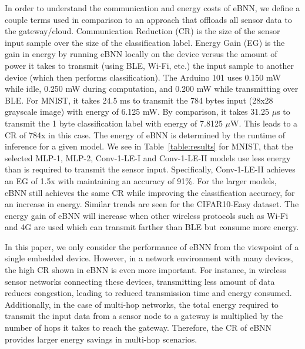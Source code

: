 \documentclass[10pt,emptycopyrightspace]{ewsn-proc}
\begin{document}
In order to understand the communication and energy costs of eBNN, we define a couple terms used in comparison to an approach that offloads all sensor data to the gateway/cloud. Communication Reduction (CR) is the size of the sensor input sample over the size of the classification label. Energy Gain (EG) is the gain in energy by running eBNN locally on the device versus the amount of power it takes to transmit (using BLE, Wi-Fi, etc.) the input sample to another device (which then performs classification). The Arduino 101 uses 0.150 mW while idle,  0.250 mW during computation, and 0.200 mW while transmitting over BLE. 
For MNIST, it takes 24.5 ms to transmit the 784 bytes input (28x28 grayscale image) with energy of 6.125 mW. By comparison, it takes 31.25 $\mu$s to transmit the 1 byte classification label with energy of 7.8125 $\mu$W. This leads to a CR of 784x in this case. The energy of eBNN is determined by the runtime of inference for a given model. We see in Table~\ref{table:results} for MNIST, that the selected MLP-1, MLP-2, Conv-1-LE-I and Conv-1-LE-II models use less energy than is required to transmit the sensor input. Specifically, Conv-1-LE-II achieves an EG of 1.5x with maintaining an accuracy of 91\%. For the larger models, eBNN still achieves the same CR while improving the classification accuracy, for an increase in energy. Similar trends are seen for the CIFAR10-Easy dataset. The energy gain of eBNN will increase when other wireless protocols such as Wi-Fi and 4G are used which can transmit farther than BLE but consume more energy.

In this paper, we only consider the performance of eBNN from the viewpoint of a single embedded device. However, in a network environment with many devices, the high CR shown in eBNN is even more important. For instance, in wireless sensor networks connecting these devices, transmitting less amount of data reduces congestion, leading to reduced transmission time and energy consumed. Additionally, in the case of multi-hop networks, the total energy required to transmit the input data from a sensor node to a gateway is multiplied by the number of hops it takes to reach the gateway. Therefore, the CR of eBNN provides larger energy savings in multi-hop scenarios. 
\end{document}
